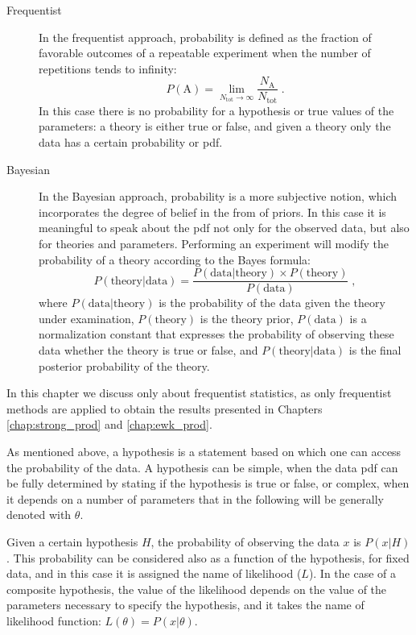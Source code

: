\begin{description}
\item[Frequentist] In the frequentist approach, probability is defined as the fraction of favorable outcomes of a repeatable experiment when the number of repetitions tends to infinity:
\begin{equation}
P(\mathrm{A}) = \lim_{N_{\mathrm{tot}} \rightarrow \infty} \frac{N_\mathrm{A}}{N_{\mathrm{tot}}} \; .
\end{equation}
In this case there is no probability for a hypothesis or true values of the parameters: a theory is either true or false, and given a theory only the data has a certain probability or \gls{pdf}.

\item[Bayesian] In the Bayesian approach, probability is a more subjective notion, which incorporates the degree of belief in the from of priors. In this case it is meaningful to speak about the \gls{pdf} not only for the observed data, but also for theories and parameters. Performing an experiment will modify the probability of a theory according to the Bayes formula:
\begin{equation}
P(\mathrm{theory} | \mathrm{data}) = \frac{ P(\mathrm{data}|\mathrm{theory}) \times P(\mathrm{theory})}{P(\mathrm{data})} \; ,
\end{equation}
where $P(\mathrm{data}|\mathrm{theory})$ is the probability of the data given the theory under examination, $P(\mathrm{theory})$ is the theory prior, $P(\mathrm{data})$ is a normalization constant that expresses the probability of observing these data whether the theory is true or false, and $P(\mathrm{theory} | \mathrm{data})$ is the final posterior probability of the theory.

\end{description}

In this chapter we discuss only about frequentist statistics, as only frequentist methods are applied to obtain the results presented in Chapters \ref{chap:strong_prod} and \ref{chap:ewk_prod}. 

As mentioned above, a hypothesis is a statement based on which one can access the probability of the data. A hypothesis can be simple, when the data \gls{pdf} can be fully determined by stating if the hypothesis is true or false, or complex, when it depends on a number of parameters that in the following will be generally denoted with $\theta$. 

Given a certain hypothesis $H$, the probability of observing the data $x$ is $P(x|H)$. This probability can be considered also as a function of the hypothesis, for fixed data, and in this case it is assigned the name of likelihood ($L$). In the case of a composite hypothesis, the value of the likelihood depends on the value of the parameters necessary to specify the hypothesis, and it takes the name of likelihood function: $L(\theta)=P(x|\theta)$.

